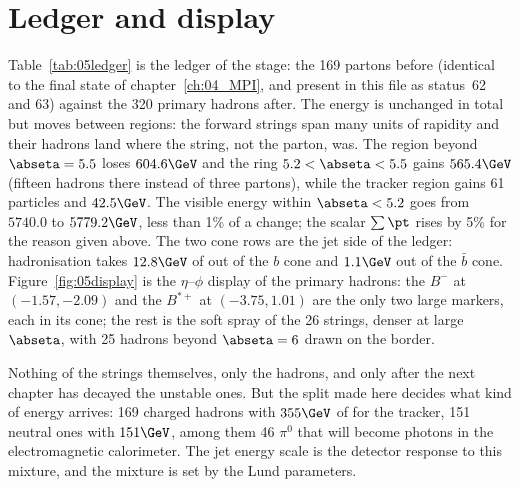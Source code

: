 \section{Ledger and display}
Table~\ref{tab:05ledger} is the ledger of the stage: the 169 partons before (identical to the final state of
chapter~\ref{ch:04_MPI}, and present in this file as status~62 and 63) against the 320 primary hadrons after.
The energy is unchanged in total but moves between regions: the forward strings span many units of
rapidity and their hadrons land where the string, not the parton, was. The region beyond $\abseta=5.5$ loses
$604.6\GeV$ and the ring $5.2<\abseta<5.5$ gains $565.4\GeV$ (fifteen hadrons there instead of three
partons), while the tracker region gains 61 particles and $42.5\GeV$. The visible energy within $\abseta<5.2$
goes from $5740.0$ to $5779.2\GeV$, less than 1\% of a change; the scalar $\sum\pt$ rises by 5\% for the
reason given above. The two cone rows are the jet side of the ledger: hadronisation takes $12.8\GeV$ of \pt{}
out of the $b$ cone and $1.1\GeV$ out of the $\bar b$ cone. Figure~\ref{fig:05display} is the $\eta$--$\phi$
display of the primary hadrons: the $B^-$ at $(-1.57,-2.09)$ and the $B^{*+}$ at $(-3.75,1.01)$ are the only two
large markers, each in its cone; the rest is the soft spray of the 26 strings, denser at large $\abseta$, with
25 hadrons beyond $\abseta=6$ drawn on the border.

\begin{plainwords}
Nothing of the strings themselves, only the hadrons, and only after the next chapter has decayed the unstable
ones. But the split made here decides what kind of energy arrives: 169 charged hadrons with $355\GeV$ of \pt{}
for the tracker, 151 neutral ones with $151\GeV$, among them 46 $\pi^0$ that will become photons in the
electromagnetic calorimeter. The jet energy scale is the detector response to this mixture, and the mixture is
set by the Lund parameters.
\end{plainwords}

